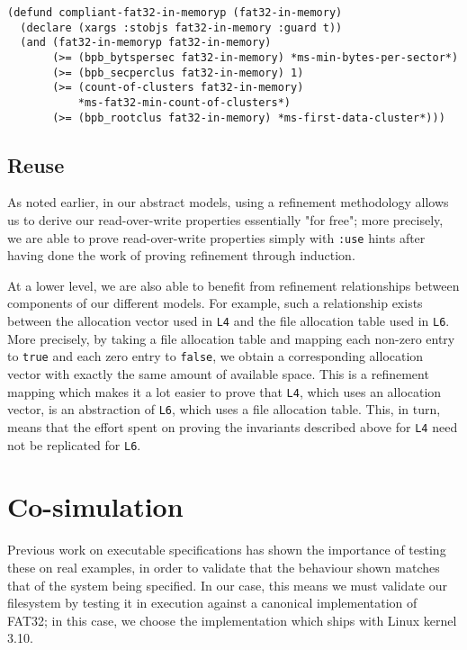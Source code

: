 \documentclass[submission,copyright,creativecommons]{eptcs}
\begin{document}
\medskip

\noindent
\begin{verbatim}
(defund compliant-fat32-in-memoryp (fat32-in-memory)
  (declare (xargs :stobjs fat32-in-memory :guard t))
  (and (fat32-in-memoryp fat32-in-memory)
       (>= (bpb_bytspersec fat32-in-memory) *ms-min-bytes-per-sector*)
       (>= (bpb_secperclus fat32-in-memory) 1)
       (>= (count-of-clusters fat32-in-memory)
           *ms-fat32-min-count-of-clusters*)
       (>= (bpb_rootclus fat32-in-memory) *ms-first-data-cluster*)))
\end{verbatim}

\subsection{Reuse}

As noted earlier, in our abstract models, using a refinement
methodology allows us to derive our read-over-write properties
essentially "for free"; more precisely, we are able to prove
read-over-write properties simply with \texttt{:use} hints after
having done the work of proving refinement through induction.

At a lower level, we are also able to benefit from refinement
relationships between components of our different models. For example,
such a relationship exists between the allocation vector used in
\texttt{L4} and the file allocation table used in \texttt{L6}. More
precisely, by taking a file allocation table and mapping each non-zero
entry to \texttt{true} and each zero entry to \texttt{false}, we
obtain a corresponding allocation vector with exactly the same amount
of available space. This is a refinement mapping which makes it a lot
easier to prove that \texttt{L4}, which uses an allocation vector, is
an abstraction of \texttt{L6}, which uses a file allocation
table. This, in turn, means that the effort spent on proving the
invariants described above for \texttt{L4} need not be replicated for
\texttt{L6}.

\section{Co-simulation}

Previous work on executable specifications \cite{goel2014simulation}
has shown the importance of testing these on real examples, in order
to validate that the behaviour shown matches that of the system being
specified. In our case, this means we must validate our filesystem by
testing it in execution against a canonical implementation of FAT32;
in this case, we choose the implementation which ships with Linux
kernel 3.10.
\end{document}
